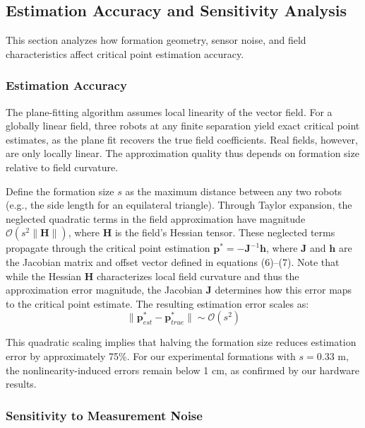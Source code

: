 \documentclass[lettersize,journal]{IEEEtran}
\begin{document}
\subsection{Estimation Accuracy and Sensitivity Analysis}

This section analyzes how formation geometry, sensor noise, and field characteristics affect critical point estimation accuracy.

\subsubsection{Estimation Accuracy}

The plane-fitting algorithm assumes local linearity of the vector field. For a globally linear field, three robots at any finite separation yield exact critical point estimates, as the plane fit recovers the true field coefficients. Real fields, however, are only locally linear. The approximation quality thus depends on formation size relative to field curvature.

Define the formation size $s$ as the maximum distance between any two robots (e.g., the side length for an equilateral triangle). Through Taylor expansion, the neglected quadratic terms in the field approximation have magnitude $\mathcal{O}(s^2\|\mathbf{H}\|)$, where $\mathbf{H}$ is the field's Hessian tensor. These neglected terms propagate through the critical point estimation $\mathbf{p}^* = -\mathbf{J}^{-1}\mathbf{h}$, where $\mathbf{J}$ and $\mathbf{h}$ are the Jacobian matrix and offset vector defined in equations (6)--(7). Note that while the Hessian $\mathbf{H}$ characterizes local field curvature and thus the approximation error magnitude, the Jacobian $\mathbf{J}$ determines how this error maps to the critical point estimate. The resulting estimation error scales as:
\begin{equation}
\|\mathbf{p}^*_{est} - \mathbf{p}^*_{true}\| \sim \mathcal{O}(s^2)
\end{equation}

This quadratic scaling implies that halving the formation size reduces estimation error by approximately 75\%. For our experimental formations with $s = 0.33$ m, the nonlinearity-induced errors remain below 1 cm, as confirmed by our hardware results.

\subsubsection{Sensitivity to Measurement Noise}
\end{document}
